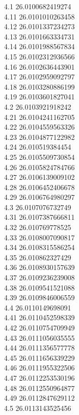 {4.1	26.0100682419274\\
4.11	26.0101010263458\\
4.12	26.0101337234273\\
4.13	26.0101663334731\\
4.14	26.0101988567834\\
4.15	26.0102312936566\\
4.16	26.0102636443901\\
4.17	26.0102959092797\\
4.18	26.0103280886199\\
4.19	26.0103601827041\\
4.2	26.0103921918242\\
4.21	26.0104241162705\\
4.22	26.0104559563326\\
4.23	26.0104877122982\\
4.24	26.010519384454\\
4.25	26.0105509730854\\
4.26	26.0105824784766\\
4.27	26.0106139009102\\
4.28	26.0106452406678\\
4.29	26.0106764980297\\
4.3	26.0107076732749\\
4.31	26.0107387666811\\
4.32	26.010769778525\\
4.33	26.0108007090817\\
4.34	26.0108315586254\\
4.35	26.010862327429\\
4.36	26.0108930157639\\
4.37	26.0109236239008\\
4.38	26.0109541521088\\
4.39	26.0109846006559\\
4.4	26.0110149698091\\
4.41	26.0110452598339\\
4.42	26.0110754709949\\
4.43	26.0111056035555\\
4.44	26.0111356577778\\
4.45	26.0111656339229\\
4.46	26.0111955322506\\
4.47	26.0112253530196\\
4.48	26.0112550964877\\
4.49	26.0112847629112\\
4.5	26.0113143525456\\
}
